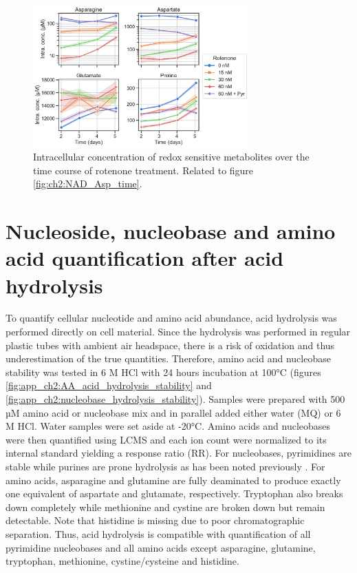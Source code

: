 \begin{figure}[ht!]
    \centering
    \includegraphics[width=0.74\textwidth]{figures/chap2/app/Asn-Asp-Glu-Pro-time_rep1.pdf}
    \caption[Redox metabolite over time after rotenone.]{
    Intracellular concentration of redox sensitive metabolites over the time course of rotenone treatment.
    Related to figure \ref{fig:ch2:NAD_Asp_time}.
    }
    \label{fig:ch2:app:Metab_by_day}
\end{figure}




\section{Nucleoside, nucleobase and amino acid quantification after acid hydrolysis}
\label{sec:ch2:app:quant}
To quantify cellular nucleotide and amino acid abundance, acid hydrolysis was performed directly on cell material.
Since the hydrolysis was performed in regular plastic tubes with ambient air headspace, there is a risk of oxidation and thus underestimation of the true quantities.
Therefore, amino acid and nucleobase stability was tested in 6 M HCl with 24 hours incubation at 100°C (figures \ref{fig:app_ch2:AA_acid_hydrolysis_stability} and \ref{fig:app_ch2:nucleobase_hydrolysis_stability}).
Samples were prepared with 500 µM amino acid or nucleobase mix and in parallel added either water (MQ) or 6 M HCl.
Water samples were set aside at -20°C.
Amino acids and nucleobases were then quantified using LCMS and each ion count were normalized to its internal standard yielding a response ratio (RR).
For nucleobases, pyrimidines are stable while purines are prone hydrolysis as has been noted previously \cite{Strecker1861-mh, Wulff1892-og, Hunter1936-iu, Markham1949-qy}.
For amino acids, asparagine and glutamine are fully deaminated to produce exactly one equivalent of aspartate and glutamate, respectively.
Tryptophan also breaks down completely while methionine and cystine are broken down but remain detectable.
Note that histidine is missing due to poor chromatographic separation.  
Thus, acid hydrolysis is compatible with quantification of all pyrimidine nucleobases and all amino acids except asparagine, glutamine, tryptophan, methionine, cystine/cysteine and histidine.


